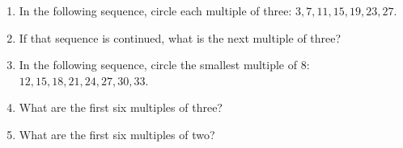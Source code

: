 \documentclass[12pt]{article}
\begin{document}
\begin{enumerate}
\item In the following sequence, circle each multiple of three: $3,7,11,15,19,23,27$.
  \vspace{0.5in}
  \vspace{0.5in}

\item If that sequence is continued, what is the next multiple of three? 
  \vspace{0.5in}
  \vspace{0.5in}

\item In the following sequence, circle the smallest multiple of 8: $12,15,18,21,24,27,30,33$.
  \vspace{0.5in}

\item What are the first six multiples of three? 
  \vspace{0.5in}

\item What are the first six multiples of two? 
  \vspace{0.5in}

\end{enumerate}
\end{document}
